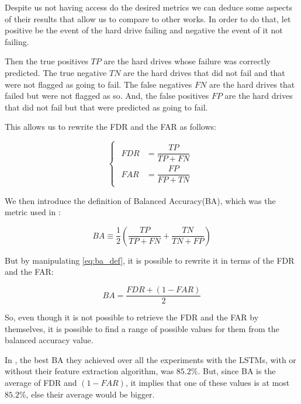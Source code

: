 Despite us not having access do the desired metrics we can deduce some aspects of their results that allow us to compare to other works.
In order to do that, let positive be the event of the hard drive failing and negative the event of it not failing.

Then the true positives $TP$ are the hard drives whose failure was correctly predicted.
The true negative $TN$ are the hard drives that did not fail and that were not flagged as going to fail.
The false negatives $FN$ are the hard drives that failed but were not flagged as so.
And, the false positives $FP$ are the hard drives that did not fail but that were predicted as going to fail.

This allows us to rewrite the FDR and the FAR as follows:

\begin{equation}
    \begin{cases}
        \begin{aligned}
            FDR &= \dfrac{TP}{TP + FN} \\
            FAR &= \dfrac{FP}{FP + TN}
        \end{aligned}
    \end{cases}
\end{equation}

We then introduce the definition of Balanced Accuracy(BA), which was the metric used in \cite{zhang2017deep}:

\begin{equation}\label{eq:ba_def}
    BA \equiv \dfrac{1}{2}\left(\dfrac{TP}{TP + FN} + \dfrac{TN}{TN + FP}\right)
\end{equation}

But by manipulating \ref{eq:ba_def}, it is possible to rewrite it in terms of the FDR and the FAR:

\begin{equation}
    BA = \dfrac{FDR + (1-FAR)}{2}
\end{equation}

So, even though it is not possible to retrieve the FDR and the FAR by themselves, it is possible to find a range of possible values for them from the balanced accuracy value.

In \cite{zhang2017deep}, the best BA they achieved over all the experiments with the LSTMs, with or without their feature extraction algorithm, was $85.2\%$.
But, since BA is the average of FDR and $(1-FAR)$, it implies that one of these values is at most $85.2\%$, else their average would be bigger.

